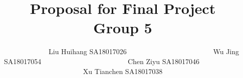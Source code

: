 
\title{
    Proposal for Final Project \\{\vspace{1em} \small Group 5}
}

\author{\name $\quad\quad\quad\quad\quad\quad$Liu Huihang   {\email SA18017026$\quad\quad\quad\quad\quad\quad$}
        \AND
        \name $\quad\quad\quad\quad\quad\quad$Wu Jing       {\email SA18017054$\quad\quad\quad\quad\quad\quad$}
        \AND
        \name $\quad\quad\quad\quad\quad\quad$Chen Ziyu     {\email SA18017046$\quad\quad\quad\quad\quad\quad$}
        \AND
        \name $\quad\quad\quad\quad\quad\quad$Xu Tianchen   {\email SA18017038$\quad\quad\quad\quad\quad\quad$}
}


\maketitle